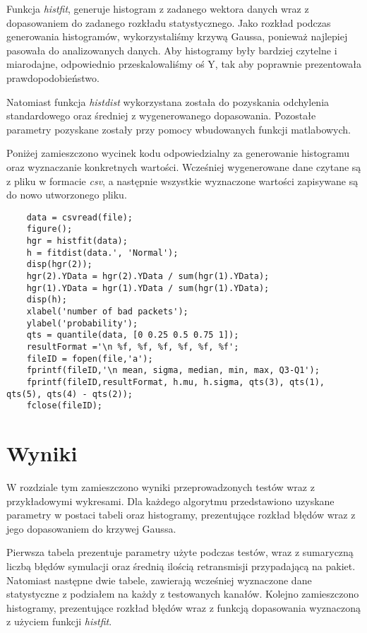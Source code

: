 \documentclass{article}
\begin{document}
Funkcja \textit{histfit}, generuje histogram z zadanego wektora danych wraz z dopasowaniem do zadanego rozkładu statystycznego. Jako rozkład podczas generowania histogramów, wykorzystaliśmy krzywą Gaussa, ponieważ najlepiej pasowała do analizowanych danych. Aby histogramy były bardziej czytelne i miarodajne, odpowiednio przeskalowaliśmy oś Y, tak aby poprawnie prezentowała prawdopodobieństwo.

Natomiast funkcja \textit{histdist} wykorzystana została do pozyskania odchylenia standardowego oraz średniej z wygenerowanego dopasowania. Pozostałe parametry pozyskane zostały przy pomocy wbudowanych funkcji matlabowych. 

Poniżej zamieszczono wycinek kodu odpowiedzialny za generowanie histogramu oraz wyznaczanie konkretnych wartości. Wcześniej wygenerowane dane czytane są z pliku w formacie \textit{csv}, a następnie wszystkie wyznaczone wartości zapisywane są do nowo utworzonego pliku.

\newpage

\begin{verbatim}
    data = csvread(file);
    figure();
    hgr = histfit(data);
    h = fitdist(data.', 'Normal');
    disp(hgr(2));
    hgr(2).YData = hgr(2).YData / sum(hgr(1).YData);
    hgr(1).YData = hgr(1).YData / sum(hgr(1).YData);
    disp(h);
    xlabel('number of bad packets');
    ylabel('probability');
    qts = quantile(data, [0 0.25 0.5 0.75 1]);
    resultFormat ='\n %f, %f, %f, %f, %f, %f';
    fileID = fopen(file,'a');
    fprintf(fileID,'\n mean, sigma, median, min, max, Q3-Q1');
    fprintf(fileID,resultFormat, h.mu, h.sigma, qts(3), qts(1), qts(5), qts(4) - qts(2));
    fclose(fileID);
\end{verbatim}

\section{Wyniki}

W rozdziale tym zamieszczono wyniki przeprowadzonych testów wraz z przykładowymi wykresami. Dla każdego algorytmu przedstawiono uzyskane parametry w postaci tabeli oraz histogramy, prezentujące rozkład błędów wraz z jego dopasowaniem do krzywej Gaussa.

Pierwsza tabela prezentuje parametry użyte podczas testów, wraz z sumaryczną liczbą błędów symulacji oraz średnią ilością retransmisji przypadającą na pakiet. Natomiast następne dwie tabele, zawierają wcześniej wyznaczone dane statystyczne z podziałem na każdy z testowanych kanałów. Kolejno zamieszczono histogramy, prezentujące rozkład błędów wraz z funkcją dopasowania wyznaczoną z użyciem funkcji \textit{ histfit}.
\end{document}
